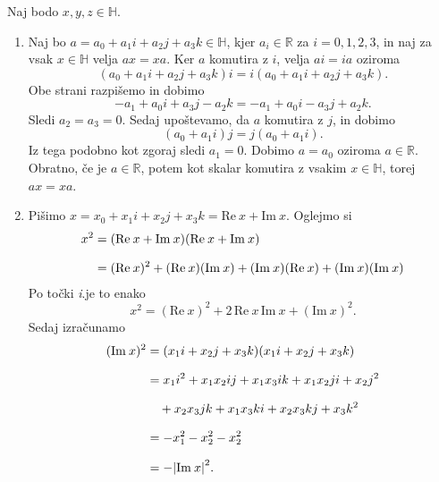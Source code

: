 \documentclass[mat1, tisk]{fmfdelo}
\numberwithin{equation}{section}
\begin{document}
\begin{dokaz}
    Naj bodo $x, y, z \in \mathbb{H}$.
    \begin{enumerate}
        \item Naj bo $a = a_{0} + a_{1}i + a_{2}j + a_{3}k \in \mathbb{H}$, kjer $a_i \in \mathbb{R}$ za $i = 0, 1, 2, 3$, in naj za vsak $x \in \mathbb{H}$ velja
        $ax = xa$. Ker $a$ komutira z $i$, velja $ai=ia$ oziroma 
        $$(a_{0} + a_{1}i + a_{2}j + a_{3}k)i = i(a_{0} + a_{1}i + a_{2}j + a_{3}k).$$
        Obe strani razpišemo in dobimo
        $$-a_{1} + a_{0}i + a_{3}j - a_{2}k = -a_{1} + a_{0}i - a_{3}j  + a_{2}k.$$
        Sledi $a_{2} = a_{3} = 0$.
        Sedaj upoštevamo, da $a$ komutira z $j$, in dobimo
        $$(a_{0} + a_{1}i)j = j(a_{0} + a_{1}i).$$
        Iz tega podobno kot zgoraj sledi $a_{1} = 0$.
        Dobimo $a = a_0$ oziroma $a \in \mathbb{R}$. Obratno, če je $a\in\mathbb{R}$, potem kot skalar komutira z vsakim $x\in\mathbb{H}$, torej $ax=xa$.
        \item Pišimo $x = x_{0} + x_{1}i + x_{2}j + x_{3}k = \mathrm{Re} \: x + \mathrm{Im} \: x$. Oglejmo si 
        \begin{equation*}
        \setlength{\jot}{10pt}
            \begin{aligned}
                x^2 &= (\mathrm{Re} \: x + \mathrm{Im} \: x)(\mathrm{Re} \: x + \mathrm{Im} \: x) \\
                &= (\mathrm{Re} \: x)^2 + (\mathrm{Re} \: x)(\mathrm{Im} \: x) + (\mathrm{Im} \: x)(\mathrm{Re} \: x) + (\mathrm{Im} \: x)(\mathrm{Im} \: x)
            \end{aligned}
        \end{equation*}
        Po točki \textit{i}.\@ je to enako
        $$x^2 = (\mathrm{Re} \: x)^2 + 2 \,\mathrm{Re} \: x \, \mathrm{Im} \: x + (\mathrm{Im} \: x)^2.$$
        Sedaj izračunamo
        \begin{equation*}
        \setlength{\jot}{10pt}
            \begin{aligned}
                (\mathrm{Im} \: x)^2 &=  (x_{1}i + x_{2}j + x_{3}k)(x_{1}i + x_{2}j + x_{3}k)\\
                & =  x_{1}i^2 + x_{1}x_{2}ij + x_{1}x_{3}ik + x_{1}x_{2}ji + x_{2}j^2 \\
                &\quad + x_{2}x_{3}jk + x_{1}x_{3}ki + x_{2}x_{3}kj + x_{3}k^2 \\
                &= -x_{1}^2 -x_{2}^2 -x_{2}^2 \\
                &= -{|\mathrm{Im} \: x|}^2.
            \end{aligned}

\end{equation*}
\end{enumerate}
\end{dokaz}
\end{document}
